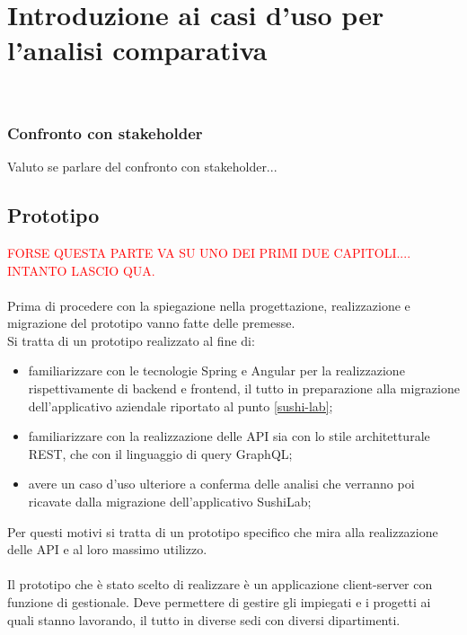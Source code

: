 
\chapter{Introduzione ai casi d'uso per l'analisi comparativa}
\label{cap:casi-uso}

\\
\subsection{Confronto con stakeholder}
Valuto se parlare del confronto con stakeholder...
\section{Prototipo}
\textcolor{red}{FORSE QUESTA PARTE VA SU UNO DEI PRIMI DUE CAPITOLI.... INTANTO LASCIO QUA.}\\\\
Prima di procedere con la spiegazione nella progettazione, realizzazione e migrazione del prototipo vanno fatte delle premesse.\\
Si tratta di un prototipo realizzato al fine di:
\begin{itemize}
  \item familiarizzare con le tecnologie Spring e Angular per la realizzazione rispettivamente di backend e frontend, il tutto in preparazione alla migrazione dell'applicativo aziendale riportato al punto \ref{sushi-lab};
  \item familiarizzare con la realizzazione delle API sia con lo stile architetturale REST, che con il linguaggio di query GraphQL;
  \item avere un caso d'uso ulteriore a conferma delle analisi che verranno poi ricavate dalla migrazione dell'applicativo SushiLab;
\end{itemize}
Per questi motivi si tratta di un prototipo specifico che mira alla realizzazione delle API e al loro massimo utilizzo.\\\\
Il prototipo che è stato scelto di realizzare è un applicazione client-server con funzione di gestionale. Deve permettere di gestire gli impiegati e i progetti ai quali stanno lavorando, il tutto in diverse sedi con diversi dipartimenti.
